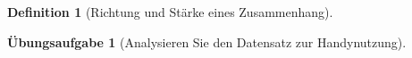 \documentclass[
  a4paper,
  DIV=11]{scrreprt}
\theoremstyle{definition}
\newtheorem{exercise}{Übungsaufgabe}[chapter]
\theoremstyle{definition}
\theoremstyle{definition}
\newtheorem{definition}{Definition}[chapter]
\theoremstyle{remark}
\begin{document}
\begin{definition}[Richtung und Stärke eines
Zusammenhang]
\begin{exercise}[Analysieren Sie den Datensatz zur
Handynutzung]
\begin{tcolorbox}
\end{tcolorbox}

\begin{figure}

\begin{minipage}{0.50\linewidth}



\end{minipage}%
%
\begin{minipage}{0.50\linewidth}



\end{minipage}
\end{figure}
\end{exercise}
\end{definition}
\end{document}
